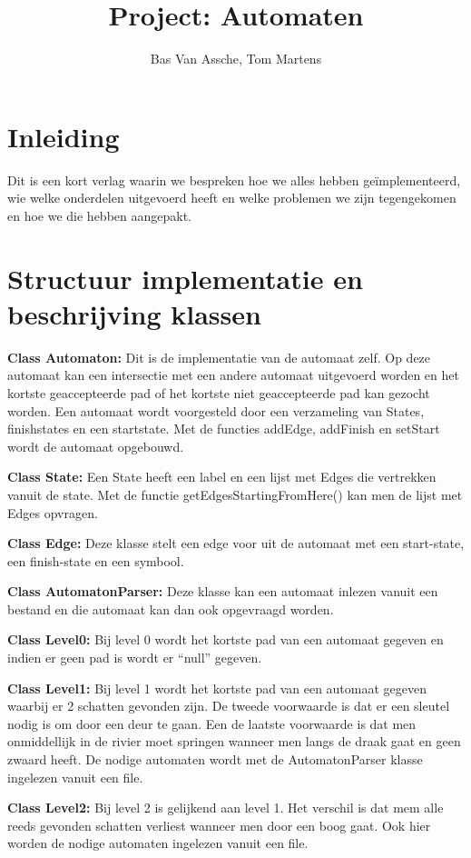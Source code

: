 \documentclass[a4paper, 11pt]{article}
\title{Project: Automaten}
\author{Bas Van Assche, Tom Martens}
\begin{document}
	\maketitle
	\tableofcontents
	\newpage
	\section{Inleiding}
		Dit is een kort verlag waarin we bespreken hoe we alles hebben geïmplementeerd, wie welke onderdelen uitgevoerd heeft en welke problemen we zijn tegengekomen en hoe we die hebben aangepakt.
	
	\section{Structuur implementatie en beschrijving klassen}
		\textbf{Class Automaton:}
		Dit is de implementatie van de automaat zelf. Op deze automaat kan een intersectie met een andere automaat uitgevoerd worden en het kortste geaccepteerde pad of het kortste niet geaccepteerde pad kan gezocht worden. Een automaat wordt voorgesteld door een verzameling van States, finishstates en een startstate. Met de functies addEdge, addFinish en setStart wordt de automaat opgebouwd.
		
		\textbf{Class State:}
		Een State heeft een label en een lijst met Edges die vertrekken vanuit de state. Met de functie getEdgesStartingFromHere() kan men de lijst met Edges opvragen.
		
		\textbf{Class Edge:}
		Deze klasse stelt een edge voor uit de automaat met een start-state, een finish-state en een symbool.
		
		\textbf{Class AutomatonParser:}
		Deze klasse kan een automaat inlezen vanuit een bestand en die automaat kan dan ook opgevraagd worden.
		
		\textbf{Class Level0:}
		Bij level 0 wordt het kortste pad van een automaat gegeven en indien er geen pad is wordt er “null” gegeven.
		
		\textbf{Class Level1:}
		Bij level 1 wordt het kortste pad van een automaat gegeven waarbij er 2 schatten gevonden zijn. De tweede voorwaarde is dat er een sleutel nodig is om door een deur te gaan. Een de laatste voorwaarde is dat men onmiddellijk in de rivier moet springen wanneer men langs de draak gaat en geen zwaard heeft. De nodige automaten wordt met de AutomatonParser klasse ingelezen vanuit een file.
		
		\textbf{Class Level2:}
		Bij level 2 is gelijkend aan level 1. Het verschil is dat mem alle reeds gevonden schatten verliest wanneer men door een boog gaat. Ook hier worden de nodige automaten ingelezen vanuit een file.
		
\end{document}
